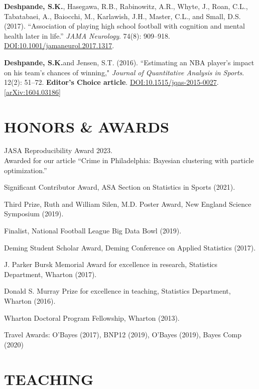 \documentclass[margin]{res}
\def\skd{\textbf{Deshpande, S.K.}}
\begin{document}
\begin{resume}
\skd, Hasegawa, R.B., Rabinowitz, A.R., Whyte, J., Roan, C.L., Tabatabaei, A., Baiocchi, M., Karlawish, J.H., Master, C.L., and Small, D.S. (2017). ``Association of playing high school football with cognition and mental health later in life.'' \textit{JAMA Neurology}. 74(8): 909--918. \href{https://doi.org/10.1001/jamaneurol.2017.1317}{DOI:10.1001/jamaneurol.2017.1317}.

\skd and Jensen, S.T. (2016). ``Estimating an NBA player's impact on his team's chances of winning," \textit{Journal of Quantitative Analysis in Sports}. 12(2): 51--72. \textbf{Editor's Choice article}.  \href{https://doi.org/10.1515/jqas-2015-0027}{DOI:10.1515/jqas-2015-0027}.\href{https://arxiv.org/abs/1604.03186}{[arXiv:1604.03186]}


\section{HONORS \& AWARDS} 

JASA Reproducibility Award 2023. \\
Awarded for our article ``Crime in Philadelphia: Bayesian clustering with particle optimization.''

Significant Contributor Award, ASA Section on Statistics in Sports (2021).

Third Prize, Ruth and William Silen, M.D. Poster Award, New England Science Symposium (2019).

Finalist, National Football League Big Data Bowl (2019).

Deming Student Scholar Award, Deming Conference on Applied Statistics (2017).

J. Parker Bursk Memorial Award for excellence in research, Statistics Department, Wharton (2017).

Donald S. Murray Prize for excellence in teaching, Statistics Department, Wharton (2016).

Wharton Doctoral Program Fellowship, Wharton (2013).

Travel Awards: O'Bayes (2017), BNP12 (2019), O'Bayes (2019), Bayes Comp (2020)

\section{TEACHING}


\end{resume}
\end{document}
